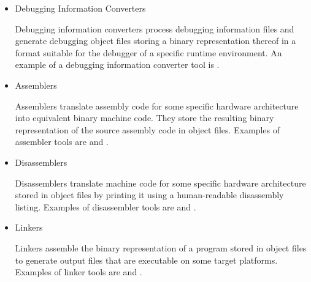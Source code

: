 \begin{itemize}

\item Debugging Information Converters\nopagebreak

Debugging information converters process debugging information files and generate debugging object files storing a binary representation thereof in a format suitable for the debugger of a specific runtime environment. \seedebugging
An example of a debugging information converter tool is .


\item Assemblers\nopagebreak

Assemblers translate assembly code for some specific hardware architecture into equivalent binary machine code.
They store the resulting binary representation of the source assembly code in object files. \seeassembly
Examples of assembler tools are  and .


\item Disassemblers\nopagebreak

Disassemblers translate machine code for some specific hardware architecture stored in object files by printing it using a human-readable disassembly listing.
Examples of disassembler tools are  and .


\item Linkers\nopagebreak

Linkers assemble the binary representation of a program stored in object files to generate output files that are executable on some target platforms.
Examples of linker tools are  and .


\end{itemize}

